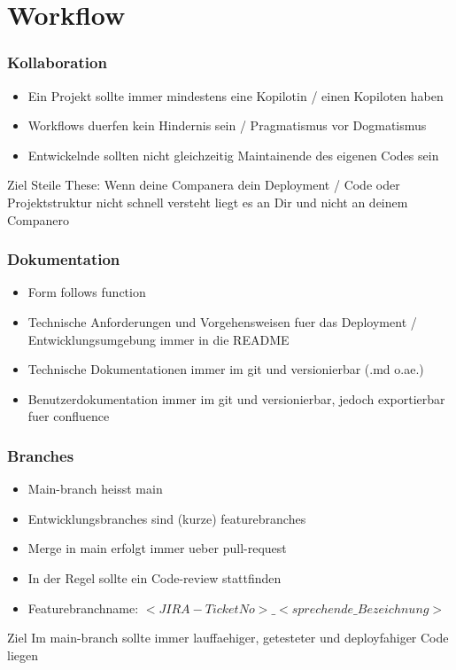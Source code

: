 \section{Workflow}
\begin{frame}
    \frametitle{Kollaboration}
    \begin{itemize}
        \item Ein Projekt sollte immer mindestens eine Kopilotin / einen Kopiloten haben
        \item Workflows duerfen kein Hindernis sein / Pragmatismus vor Dogmatismus
        \item Entwickelnde sollten nicht gleichzeitig Maintainende des eigenen Codes sein
    \end{itemize}
    \begin{block}{Ziel}
        Steile These: Wenn deine Companera dein Deployment / Code oder Projektstruktur nicht schnell versteht liegt es an Dir und nicht an deinem Companero
    \end{block}
\end{frame}
\begin{frame}
    \frametitle{Dokumentation}
    \begin{itemize}
        \item Form follows function
        \item Technische Anforderungen und Vorgehensweisen fuer das Deployment / Entwicklungsumgebung immer in die README
        \item Technische Dokumentationen immer im git und versionierbar (.md o.ae.)
        \item Benutzerdokumentation immer im git und versionierbar, jedoch exportierbar fuer confluence
    \end{itemize}
    
\end{frame}
\begin{frame}
    \frametitle{Branches}
    \begin{itemize}
    \item Main-branch heisst main
    \item Entwicklungsbranches sind (kurze) featurebranches
    \item Merge in main erfolgt immer ueber pull-request
    \item In der Regel sollte ein Code-review stattfinden
    \item Featurebranchname: $<JIRA-TicketNo>\_<sprechende\_Bezeichnung>$
    \end{itemize}
    \begin{block}{Ziel}
      Im main-branch sollte immer lauffaehiger, getesteter und deployfahiger Code liegen
      \end{block}
  \end{frame}

